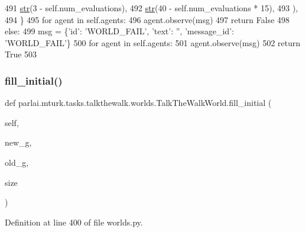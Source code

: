 \begin{DoxyCode}
491                         \hyperlink{namespacegenerate__task__READMEs_a5b88452ffb87b78c8c85ececebafc09f}{str}(3 - self.num\_evaluations),
492                         \hyperlink{namespacegenerate__task__READMEs_a5b88452ffb87b78c8c85ececebafc09f}{str}(40 - self.num\_evaluations * 15),
493                     ),
494                 \}
495                 \textcolor{keywordflow}{for} agent \textcolor{keywordflow}{in} self.agents:
496                     agent.observe(msg)
497                 \textcolor{keywordflow}{return} \textcolor{keyword}{False}
498             \textcolor{keywordflow}{else}:
499                 msg = \{\textcolor{stringliteral}{'id'}: \textcolor{stringliteral}{'WORLD\_FAIL'}, \textcolor{stringliteral}{'text'}: \textcolor{stringliteral}{''}, \textcolor{stringliteral}{'message\_id'}: \textcolor{stringliteral}{'WORLD\_FAIL'}\}
500                 \textcolor{keywordflow}{for} agent \textcolor{keywordflow}{in} self.agents:
501                     agent.observe(msg)
502                 \textcolor{keywordflow}{return} \textcolor{keyword}{True}
503 
\end{DoxyCode}
\mbox{\label{classparlai_1_1mturk_1_1tasks_1_1talkthewalk_1_1worlds_1_1TalkTheWalkWorld_adcba21d8dd2fd552fc3c7c777e704397}} 
\subsubsection{\texorpdfstring{fill\+\_\+initial()}{fill\_initial()}}
{\footnotesize\ttfamily def parlai.\+mturk.\+tasks.\+talkthewalk.\+worlds.\+Talk\+The\+Walk\+World.\+fill\+\_\+initial (\begin{DoxyParamCaption}\item[{}]{self,  }\item[{}]{new\+\_\+g,  }\item[{}]{old\+\_\+g,  }\item[{}]{size }\end{DoxyParamCaption})}



Definition at line 400 of file worlds.\+py.


